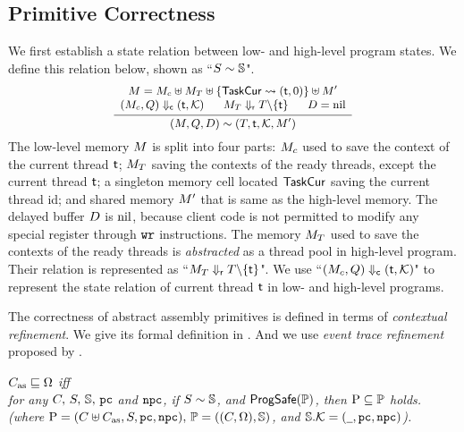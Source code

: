 % 
\subsection{Primitive Correctness}
\label{subsec:correctness-primitive}

We first establish a state relation 
between low- and high-level program states. 
We define this relation below, shown as 
``${S} \sim {\mathbb{S}}$". 
\[
    \small
    \infer
    {
        \stateRel{(\Mem, \Rstate, \DBuf)}
            {(\thrdpool, \thrdid, \hthrdlocalst, \Mem')}
    }
    {
        \begin{array}{c}
            \Mem = \Mem_c \uplus \Mem_T \uplus 
                \{ \TaskCur \rightsquigarrow (\thrdid, 0) \}
                \uplus \Mem' \\
            \curStRel{(\Mem_c, \Rstate)}{(\thrdid, \hthrdlocalst)}
            \quad \ \ 
            \rdyStRel{\Mem_T}{\thrdpool \backslash \{ \thrdid \}}
            \quad \ \ 
            \DBuf = \nil
        \end{array}
    }
\]
The low-level memory $M$ is split into four parts: 
$M_c$ used to save the context of the current thread $\textsf{t}$; 
$M_T$ saving the contexts of the ready threads, 
except the current thread $\textsf{t}$; a singleton memory 
cell located $\mathsf{TaskCur}$ saving the current thread id; and shared 
memory $M'$ that is same as the high-level memory. 
The delayed buffer $D$ is $\text{nil}$, because client 
code is not permitted to modify any special register 
through $\texttt{wr}{}$ instructions. The memory $M_T$ used to 
save the contexts of the ready threads is {\it abstracted} as a thread pool 
in high-level program. Their relation is represented as 
``${M_T} \Downarrow_{\textsf{r}} {T \backslash \{ \textsf{t} \}}$".  
We use ``${(M_c, Q)} \Downarrow_{\textsf{c}} {(\textsf{t}, \mathcal{K})}$" 
to represent the state relation of current thread $\textsf{t}$ 
in low- and high-level programs. 

The correctness of abstract assembly primitives 
is defined in terms of {\it contextual refinement}.  
We give its formal definition in 
\Def{\ref{def:prim-correctness}}.  
And we use {\it event trace refinement} 
proposed by \etal{Liang} \cite{liang14lics}.

\begin{definition}
    \em
    \label{def:prim-correctness}
    $C_{\text{as}} \sqsubseteq \Omega$ iff  \\
    for any $C, \, S, \, \mathbb{S}, \, \texttt{pc}$ and $\texttt{npc}$, if 
    ${S} \sim {\mathbb{S}}$, and $\textsf{ProgSafe}(\mathbb{P})$, 
    then $\text{P} \subseteq \mathbb{P}$ holds. 
    (where $\text{P} = (C \uplus C_{\text{as}}, S, \texttt{pc}, \texttt{npc}), \, 
        \mathbb{P} = ((C, \Omega), \mathbb{S})$, and 
        $\mathbb{S}.\mathcal{K} = (\underline{\ \,}, \texttt{pc}, \texttt{npc})$).  
\end{definition}

